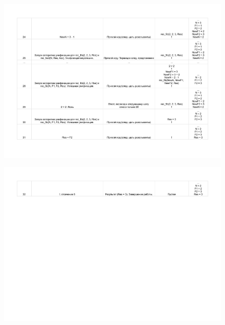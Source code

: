 \documentclass[12pt]{report}
\begin{document}
\begin{figure}[H]
	\begin{center}
		\includegraphics[scale=0.7]{imgs/table_16_02-3.pdf}
	\end{center}
\end{figure}

\begin{figure}[H]
	\begin{center}
		\includegraphics[scale=0.7]{imgs/table_16_02-4.pdf}
	\end{center}
\end{figure}
\end{document}
